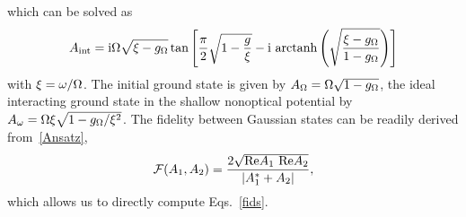 \documentclass[reprint,prx,footinbib,floatfix,twocolumn,longbibliography,superscriptaddress]{revtex4-2}
\begin{document}
which can be solved as
\begin{align}
    \PhaseFunction_{\text{int}} = \ImagUnit \Frequency \sqrt{\FrRatio - \IntG_\Frequency} \tan \left[ \frac{\pi}{2} \sqrt{1-\frac{\IntG}{\FrRatio}} - \ImagUnit \ \text{arctanh}\rounds{\sqrt{\frac{\FrRatio - \IntG_\Frequency}{1 - \IntG_\Frequency}}} \right]
\end{align}
with $\xi = \omega / \Omega$.
The initial ground state is given by $A_{\Omega} = \Omega \sqrt{1 - g_\Omega}$, the ideal interacting ground state in the shallow nonoptical potential by $A_{\omega} = \Omega \xi \sqrt{1 - g_\Omega/\xi^2}$.
The fidelity between Gaussian states can be readily derived from~\eqref{Ansatz},
\begin{align}
    \mathcal{F}(A_1,A_2) = \frac{2 \sqrt{\text{Re} A_1 \ \text{Re} A_2  }}{| A_1^* + A_2 |},
\end{align}
which allows us to directly compute Eqs.~\eqref{fids}.

\nocite{Merkel2009}

\end{document}
